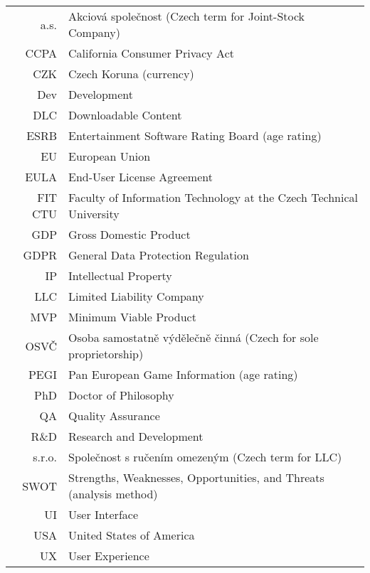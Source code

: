 \documentclass[english,bachelor,twoside]{ctufit-thesis} %
\begin{document}
\chapter{\thectufitabbreviationlabel}
	
\begin{tabular}{rl}
a.s.    & Akciová společnost (Czech term for Joint-Stock Company)\\
CCPA    & California Consumer Privacy Act\\
CZK     & Czech Koruna (currency)\\
Dev     & Development\\
DLC     & Downloadable Content\\
ESRB    & Entertainment Software Rating Board (age rating)\\
EU      & European Union\\
EULA    & End-User License Agreement\\
FIT CTU & Faculty of Information Technology at the Czech Technical University\\
GDP     & Gross Domestic Product\\
GDPR    & General Data Protection Regulation\\
IP      & Intellectual Property\\
LLC     & Limited Liability Company\\
MVP     & Minimum Viable Product\\
OSVČ    & Osoba samostatně výdělečně činná (Czech for sole proprietorship)\\
PEGI    & Pan European Game Information (age rating)\\
PhD     & Doctor of Philosophy\\
QA      & Quality Assurance\\
R\&D    & Research and Development\\
s.r.o.  & Společnost s ručením omezeným (Czech term for LLC)\\
SWOT    & Strengths, Weaknesses, Opportunities, and Threats (analysis method)\\
UI      & User Interface\\
USA     & United States of America\\
UX      & User Experience\\
\end{tabular}
\resumeTOCentries
\mainmatter\mainmatterinit %
\end{document}
